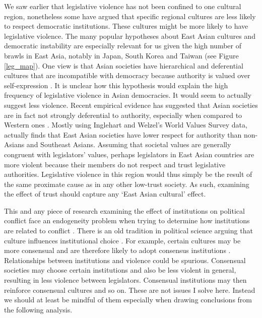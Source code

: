 \documentclass[a4paper]{article}\usepackage{graphicx, color}
\begin{document}
We saw earlier that legislative violence has not been confined to one cultural region, nonetheless some have argued that specific regional cultures are less likely to respect democratic institutions. These cultures might be more likely to have legislative violence. The many popular hypotheses about East Asian cultures and democratic instability are especially relevant for us given the high number of brawls in East Asia, notably in Japan, South Korea and Taiwan (see Figure \ref{leg_map}). One view is that Asian societies have hierarchical and deferential cultures that are incompatible with democracy because authority is valued over self-expression \citep[see][212-213 for a discussion]{Dalton2005}. It is unclear how this hypothesis would explain the high frequency of legislative violence in Asian democracies. It would seem to actually suggest less violence. Recent empirical evidence has suggested that Asian societies are in fact not strongly deferential to authority, especially when compared to Western ones \citep{Dalton2005, KimAsianValues2010}. Mostly using Inglehart and Welzel's World Values Survey data, \cite{KimAsianValues2010} actually finds that East Asian societies have lower respect for authority than non-Asians and Southeast Asians. Assuming that societal values are generally congruent with legislators' values, perhaps legislators in East Asian countries are more violent because their members do not respect and trust legislative authorities. Legislative violence in this region would thus simply be the result of the same proximate cause as in any other low-trust society. As such, examining the effect of trust should capture any `East Asian cultural' effect. 

This and any piece of research examining the effect of institutions on political conflict face an endogeneity problem when trying to determine how institutions are related to conflict \citep[][751]{Carey2000}. There is an old tradition in political science \citep[][528--529]{Frye1997} arguing that culture influences institutional choice \citep[in particular see][]{Almond1963}. For example, certain cultures may be more consensual and are therefore likely to adopt consensus institutions \citep[][22-23]{Lijphart2003}. Relationships between institutions and violence could be spurious. Consensual societies may choose certain institutions and also be less violent in general, resulting in less violence between legislators. Consensual institutions may then reinforce consensual cultures and so on. These are not issues I solve here. Instead we should at least be mindful of them especially when drawing conclusions from the following analysis.
\end{document}
